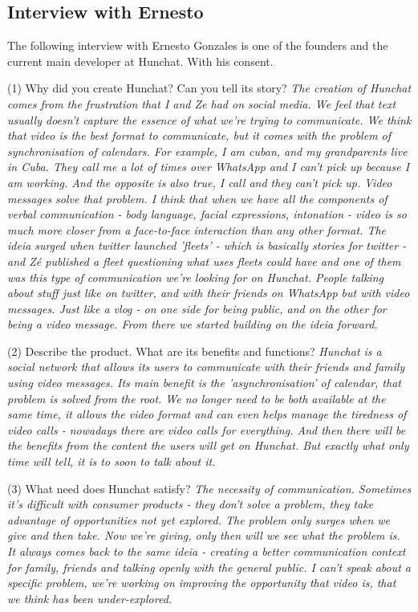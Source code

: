\documentclass[11pt]{article}
\begin{document}
\subsection{Interview with Ernesto} \label{ernesto}
The following interview with Ernesto Gonzales is one of the founders and the current main developer at Hunchat. With his consent.

(1) Why did you create Hunchat? Can you tell its story? \textit{The creation of Hunchat comes from the frustration that I and Ze had on social media. We feel that text usually doesn't capture the essence of what we're trying to communicate. We think that video is the best format to communicate, but it comes with the problem of synchronisation of calendars. For example, I am cuban, and my grandparents live in Cuba. They call me a lot of times over WhatsApp and I can't pick up because I am working. And the opposite is also true, I call and they can't pick up. Video messages solve that problem. I think that when we have all the components of verbal communication - body language, facial expressions, intonation - video is so much more closer from a face-to-face interaction than any other format. The ideia surged when twitter launched 'fleets' - which is basically stories for twitter - and Zé published a fleet questioning what uses fleets could have and one of them was this type of communication we're looking for on Hunchat. People talking about stuff just like on twitter, and with their friends on WhatsApp but with video messages. Just like a vlog - on one side for being public, and on the other for being a video message. From there we started building on the ideia forward.}

(2) Describe the product. What are its benefits and functions? \textit{Hunchat is a social network that allows its users to communicate with their friends and family using video messages. Its main benefit is the 'asynchronisation' of calendar, that problem is solved from the root. We no longer need to be both available at the same time, it allows the video format and can even helps manage the tiredness of video calls - nowadays there are video calls for everything. And then there will be the benefits from the content the users will get on Hunchat. But exactly what only time will tell, it is to soon to talk about it.}

(3) What need does Hunchat satisfy? \textit{The necessity of communication. Sometimes it's difficult with consumer products - they don't solve a problem, they take advantage of opportunities not yet explored. The problem only surges when we give and then take. Now we're giving, only then will we see what the problem is. It always comes back to the same ideia - creating a better communication context for family, friends and talking openly with the general public. I can't speak about a specific problem, we're working on improving the opportunity that video is, that we think has been under-explored.}
\end{document}
